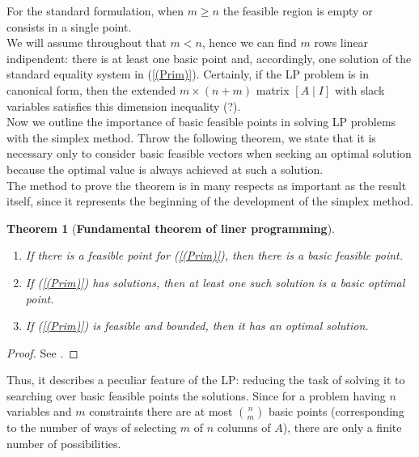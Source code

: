 \documentclass[a4paper,10 pt,titlepage,twoside]{book}
\theoremstyle{plain}
\newtheorem{thm}{Theorem}[chapter]
\theoremstyle{definition}
\theoremstyle{remark}
\begin{document}
For the standard formulation, when $m \geq n$ the feasible region is empty or consists in a single point.\\
 We will assume throughout that $m < n$, hence we can find $m$ rows linear indipendent: there is at least one basic point and, accordingly, one solution of the standard equality system in (\ref{(Prim)}). Certainly, if the LP problem is in canonical form, then the extended $m \times (n+m)$ matrix $[A\;|\;I]$ with slack variables satisfies this dimension inequality (?). \\
Now we outline the importance of basic feasible points in solving LP problems with the simplex method.
Throw the following theorem, we state that it is necessary only to consider basic feasible
vectors when seeking an optimal solution because the optimal
value is always achieved at such a solution.\\ The method to prove the theorem is in many respects as important as the result itself, since it represents the beginning of the development of the simplex
method.
\begin{thm}[\textbf{Fundamental theorem of liner programming}]\label{Fund}
\begin{enumerate}
	\
\item If there is a feasible point for (\ref{(Prim)}), then there is a basic feasible point.
\item If (\ref{(Prim)}) has solutions, then at least one such solution is a basic optimal point.
\item If (\ref{(Prim)}) is feasible and bounded, then it has an optimal solution.
\end{enumerate}
\end{thm}
\begin{proof}
	See \cite{LP}.
\end{proof}
Thus, it describes a peculiar feature of the LP: reducing the task of solving it to searching over basic feasible points the solutions. Since for a problem having $n$ variables and $m$ constraints there are at most ${n}\choose{m}$ basic points (corresponding to the number of ways of selecting $m$ of $n$ columns of $A$), there are only a finite number of possibilities. 
\end{document}
